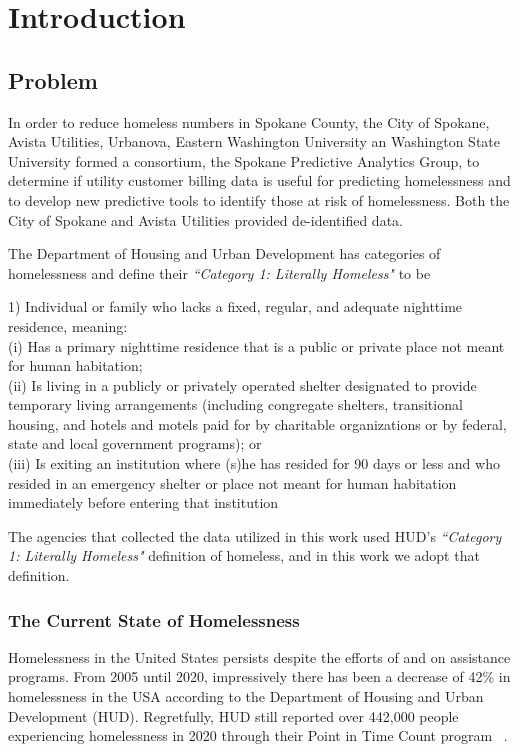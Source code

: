 \documentclass[10pt,letterpaper]{article}
\newcommand{\red}[1]{{\color{red}{#1}}}
\begin{document}



\section*{Introduction}
\subsection*{Problem}
In order to reduce homeless numbers in Spokane County, the City of Spokane, Avista Utilities, Urbanova, Eastern Washington University an Washington State University formed a consortium, the Spokane Predictive Analytics Group, to determine if utility customer billing data is useful for predicting homelessness and to develop new predictive tools to identify those at risk of homelessness.  Both the City of Spokane and Avista Utilities provided de-identified data.

The Department of Housing and Urban Development has categories of homelessness and define their \textit{``Category 1: Literally Homeless"} to be
\begin{displayquote}
1) Individual or family who lacks a fixed, regular, and adequate nighttime residence, meaning: \\
(i) Has a primary nighttime residence that is a public or private place not meant for human habitation; \\
(ii) Is living in a publicly or privately operated shelter designated to provide temporary living arrangements (including congregate shelters, transitional housing, and hotels and motels paid for by charitable organizations or by federal, state and local government programs); or \\
(iii) Is exiting an institution where (s)he has resided for 90 days or less and who resided in an emergency shelter or place not meant for human habitation immediately before entering that institution
\end{displayquote}

The agencies that collected the data utilized in this work used HUD's \textit{``Category 1: Literally Homeless"} definition of homeless, and in this work we adopt that definition.

\subsubsection*{The Current State of Homelessness}
Homelessness in the United States persists despite the efforts of \red{PROGRAMS} and \red{MONEY, MONEY spent each year} on assistance programs.  From 2005 until 2020, impressively there has been a decrease of 42\% in homelessness in the USA according to the Department of Housing and Urban Development (HUD).  Regretfully, HUD still reported over 442,000 people experiencing homelessness in 2020 through their Point in Time Count program ~\cite{PITcount}.   \red{ Is there data that shows a rise in homelessness?  Or a recent rise in light of the pandemic???}
\end{document}
